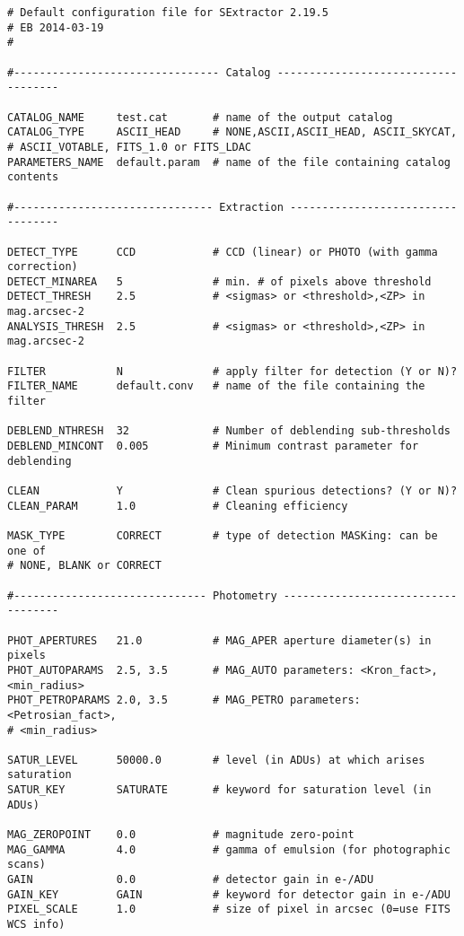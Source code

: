\documentclass{aastex}
\begin{document}
\begin{lstlisting}[caption = Configuration file for Source Extractor (YM)]
# Default configuration file for SExtractor 2.19.5
# EB 2014-03-19
#

#-------------------------------- Catalog ------------------------------------

CATALOG_NAME     test.cat       # name of the output catalog
CATALOG_TYPE     ASCII_HEAD     # NONE,ASCII,ASCII_HEAD, ASCII_SKYCAT,
# ASCII_VOTABLE, FITS_1.0 or FITS_LDAC
PARAMETERS_NAME  default.param  # name of the file containing catalog contents

#------------------------------- Extraction ----------------------------------

DETECT_TYPE      CCD            # CCD (linear) or PHOTO (with gamma correction)
DETECT_MINAREA   5              # min. # of pixels above threshold
DETECT_THRESH    2.5            # <sigmas> or <threshold>,<ZP> in mag.arcsec-2
ANALYSIS_THRESH  2.5            # <sigmas> or <threshold>,<ZP> in mag.arcsec-2

FILTER           N              # apply filter for detection (Y or N)?
FILTER_NAME      default.conv   # name of the file containing the filter

DEBLEND_NTHRESH  32             # Number of deblending sub-thresholds
DEBLEND_MINCONT  0.005          # Minimum contrast parameter for deblending

CLEAN            Y              # Clean spurious detections? (Y or N)?
CLEAN_PARAM      1.0            # Cleaning efficiency

MASK_TYPE        CORRECT        # type of detection MASKing: can be one of
# NONE, BLANK or CORRECT

#------------------------------ Photometry -----------------------------------

PHOT_APERTURES   21.0           # MAG_APER aperture diameter(s) in pixels
PHOT_AUTOPARAMS  2.5, 3.5       # MAG_AUTO parameters: <Kron_fact>,<min_radius>
PHOT_PETROPARAMS 2.0, 3.5       # MAG_PETRO parameters: <Petrosian_fact>,
# <min_radius>

SATUR_LEVEL      50000.0        # level (in ADUs) at which arises saturation
SATUR_KEY        SATURATE       # keyword for saturation level (in ADUs)

MAG_ZEROPOINT    0.0            # magnitude zero-point
MAG_GAMMA        4.0            # gamma of emulsion (for photographic scans)
GAIN             0.0            # detector gain in e-/ADU
GAIN_KEY         GAIN           # keyword for detector gain in e-/ADU
PIXEL_SCALE      1.0            # size of pixel in arcsec (0=use FITS WCS info)


\end{lstlisting}
\end{document}
